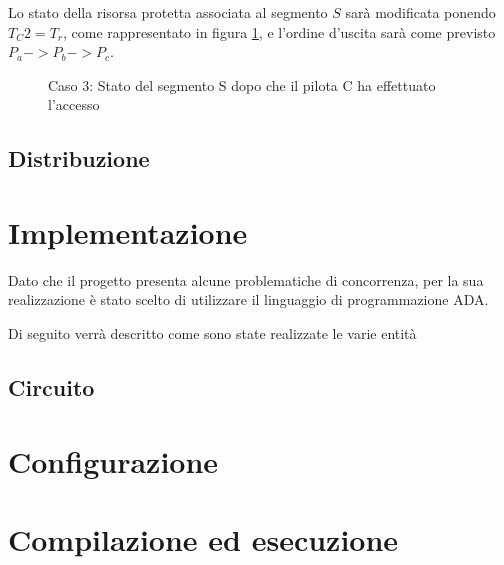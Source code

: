 \documentclass[a4paper,11pt, twoside]{book}
\begin{document}
	  Lo stato della risorsa protetta associata al segmento $S$ sarà modificata ponendo $T_C2 = T_r$,
	  come rappresentato in figura \ref{fgr:AccessoSegmentiCaso3}, e l'ordine d'uscita sarà come previsto
	  $P_a -> P_b -> P_c$.
	
	  \begin{figure}[h]
	    \centering
	    \caption{Caso 3: Stato del segmento S dopo che il pilota C ha effettuato l'accesso}
	    \label{fgr:AccessoSegmentiCaso3}
	  \end{figure}
	  
    \section{Distribuzione}
	
  \chapter{Implementazione}
    Dato che il progetto presenta alcune problematiche di concorrenza, per la sua realizzazione è stato scelto
    di utilizzare il linguaggio di programmazione ADA.
    
    Di seguito verrà descritto come sono state realizzate le varie entità
    
    \section{Circuito}
  
  \chapter{Configurazione}
      
  
  \chapter{Compilazione ed esecuzione}
\end{document}
